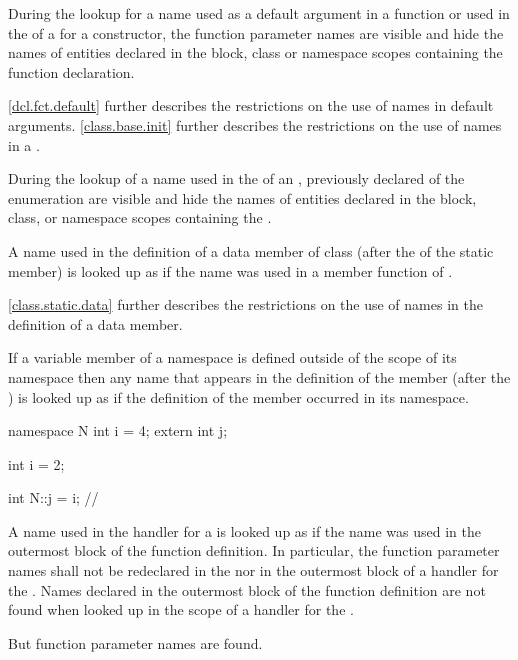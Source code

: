 \pnum
During the lookup for a name used as a default
argument in a function
 or used in the
 of a  for a
constructor, the function parameter names are
visible and hide the names of entities declared in the block, class or
namespace scopes containing the function declaration.
\begin{note}
\ref{dcl.fct.default} further describes the restrictions on the use of
names in default arguments. \ref{class.base.init} further describes the
restrictions on the use of names in a .
\end{note}

\pnum
During the lookup of a name used in the
 of an ,
previously declared  of the enumeration are visible
and hide the names of entities declared in the block, class, or namespace
scopes containing the .

\pnum
A name used in the definition of a  data member of class
 (after the 
of the static member) is looked up as if the name was used in a member
function of .
\begin{note}
\ref{class.static.data} further
describes the restrictions on the use of names in the definition of a
 data member.
\end{note}

\pnum
If a variable member of a namespace is defined outside of the scope of
its namespace then any name that appears in the definition of the
member (after the ) is looked up as if the
definition of the member occurred in its namespace.
\begin{example}
\begin{codeblock}
namespace N {
  int i = 4;
  extern int j;
}

int i = 2;

int N::j = i;       // 
\end{codeblock}
\end{example}

\pnum
A name used in the handler for a 
is looked up as if the name was used in the
outermost block of the function definition. In particular, the function
parameter names shall not be redeclared in the
 nor in the outermost block of a handler
for the . Names declared in the outermost
block of the function definition are not found when looked up in the
scope of a handler for the .
\begin{note}
But
function parameter names are found.
\end{note}

